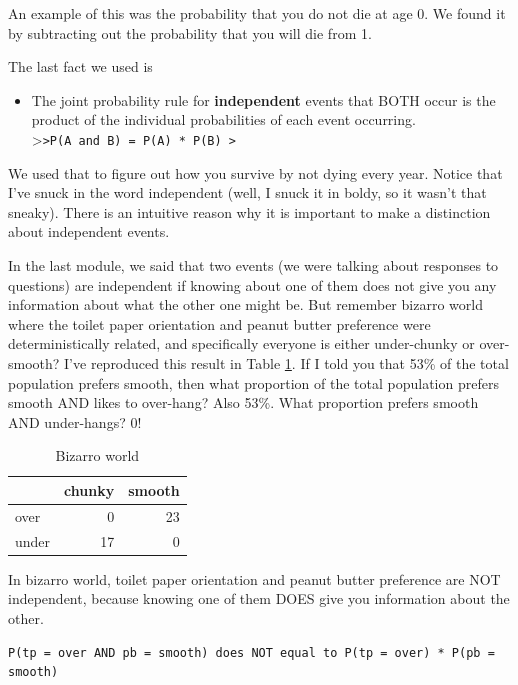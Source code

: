 \documentclass[openany]{book}
\providecommand{\tightlist}{%
  \setlength{\itemsep}{0pt}\setlength{\parskip}{0pt}}
\begin{document}
An example of this was the probability that you do not die at age 0. We found it by subtracting out the probability that you will die from 1.

The last fact we used is

\begin{itemize}
\tightlist
\item
  The joint probability rule for \textbf{independent} events that BOTH occur is the product of the individual probabilities of each event occurring.
  \textgreater{}\texttt{\textgreater{}P(A\ and\ B)\ =\ P(A)\ *\ P(B)\ \textgreater{}}
\end{itemize}

We used that to figure out how you survive by not dying every year. Notice that I've snuck in the word independent (well, I snuck it in boldy, so it wasn't that sneaky). There is an intuitive reason why it is important to make a distinction about independent events.

In the last module, we said that two events (we were talking about responses to questions) are independent if knowing about one of them does not give you any information about what the other one might be. But remember bizarro world where the toilet paper orientation and peanut butter preference were deterministically related, and specifically everyone is either under-chunky or over-smooth? I've reproduced this result in Table \ref{tab:tpxpb-reprise}. If I told you that 53\% of the total population prefers smooth, then what proportion of the total population prefers smooth AND likes to over-hang? Also 53\%. What proportion prefers smooth AND under-hangs? 0!

\begin{table}[!h]

\caption{\label{tab:tpxpb-reprise}Bizarro world}
\centering
\begin{tabular}[t]{lrr}
\toprule
  & chunky & smooth\\
\midrule
over & 0 & 23\\
under & 17 & 0\\
\bottomrule
\end{tabular}
\end{table}

In bizarro world, toilet paper orientation and peanut butter preference are NOT independent, because knowing one of them DOES give you information about the other.

\begin{verbatim}
P(tp = over AND pb = smooth) does NOT equal to P(tp = over) * P(pb = smooth)
\end{verbatim}
\end{document}
